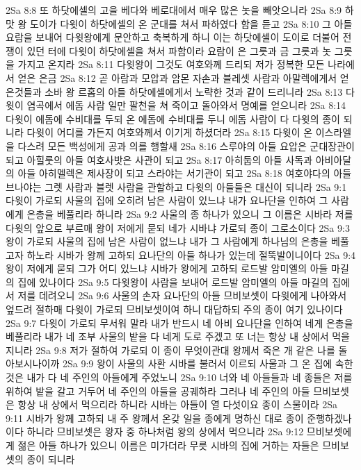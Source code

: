 2Sa 8:8  또 하닷에셀의 고을 베다와 베로대에서 매우 많은 놋을 빼앗으니라
2Sa 8:9  하맛 왕 도이가 다윗이 하닷에셀의 온 군대를 쳐서 파하였다 함을 듣고
2Sa 8:10  그 아들 요람을 보내어 다윗왕에게 문안하고 축복하게 하니 이는 하닷에셀이 도이로 더불어 전쟁이 있던 터에 다윗이 하닷에셀을 쳐서 파함이라 요람이 은 그릇과 금 그릇과 놋 그릇을 가지고 온지라
2Sa 8:11  다윗왕이 그것도 여호와께 드리되 저가 정복한 모든 나라에서 얻은 은금
2Sa 8:12  곧 아람과 모압과 암몬 자손과 블레셋 사람과 아말렉에게서 얻은것들과 소바 왕 르홉의 아들 하닷에셀에게서 노략한 것과 같이 드리니라
2Sa 8:13  다윗이 염곡에서 에돔 사람 일만 팔천을 쳐 죽이고 돌아와서 명예를 얻으니라
2Sa 8:14  다윗이 에돔에 수비대를 두되 온 에돔에 수비대를 두니 에돔 사람이 다 다윗의 종이 되니라 다윗이 어디를 가든지 여호와께서 이기게 하셨더라
2Sa 8:15  다윗이 온 이스라엘을 다스려 모든 백성에게 공과 의를 행할새
2Sa 8:16  스루야의 아들 요압은 군대장관이 되고 아힐룻의 아들 여호사밧은 사관이 되고
2Sa 8:17  아히둡의 아들 사독과 아비아달의 아들 아히멜렉은 제사장이 되고 스라야는 서기관이 되고
2Sa 8:18  여호야다의 아들 브나야는 그렛 사람과 블렛 사람을 관할하고 다윗의 아들들은 대신이 되니라
2Sa 9:1  다윗이 가로되 사울의 집에 오히려 남은 사람이 있느냐 내가 요나단을 인하여 그 사람에게 은총을 베풀리라 하니라
2Sa 9:2  사울의 종 하나가 있으니 그 이름은 시바라 저를 다윗의 앞으로 부르매 왕이 저에게 묻되 네가 시바냐 가로되 종이 그로소이다
2Sa 9:3  왕이 가로되 사울의 집에 남은 사람이 없느냐 내가 그 사람에게 하나님의 은총을 베풀고자 하노라 시바가 왕께 고하되 요나단의 아들 하나가 있는데 절뚝발이니이다
2Sa 9:4  왕이 저에게 묻되 그가 어디 있느냐 시바가 왕에게 고하되 로드발 암미엘의 아들 마길의 집에 있나이다
2Sa 9:5  다윗왕이 사람을 보내어 로드발 암미엘의 아들 마길의 집에서 저를 데려오니
2Sa 9:6  사울의 손자 요나단의 아들 므비보셋이 다윗에게 나아와서 엎드려 절하매 다윗이 가로되 므비보셋이여 하니 대답하되 주의 종이 여기 있나이다
2Sa 9:7  다윗이 가로되 무서워 말라 내가 반드시 네 아비 요나단을 인하여 네게 은총을 베풀리라 내가 네 조부 사울의 밭을 다 네게 도로 주겠고 또 너는 항상 내 상에서 먹을지니라
2Sa 9:8  저가 절하여 가로되 이 종이 무엇이관대 왕께서 죽은 개 같은 나를 돌아보시나이까
2Sa 9:9  왕이 사울의 사환 시바를 불러서 이르되 사울과 그 온 집에 속한것은 내가 다 네 주인의 아들에게 주었노니
2Sa 9:10  너와 네 아들들과 네 종들은 저를 위하여 밭을 갈고 거두어 네 주인의 아들을 공궤하라 그러나 네 주인의 아들 므비보셋은 항상 내 상에서 먹으리라 하니라 시바는 아들이 열 다섯이요 종이 스물이라
2Sa 9:11  시바가 왕께 고하되 내 주 왕께서 온갖 일을 종에게 명하신 대로 종이 준행하겠나이다 하니라 므비보셋은 왕자 중 하나처럼 왕의 상에서 먹으니라
2Sa 9:12  므비보셋에게 젊은 아들 하나가 있으니 이름은 미가더라 무릇 시바의 집에 거하는 자들은 므비보셋의 종이 되니라
